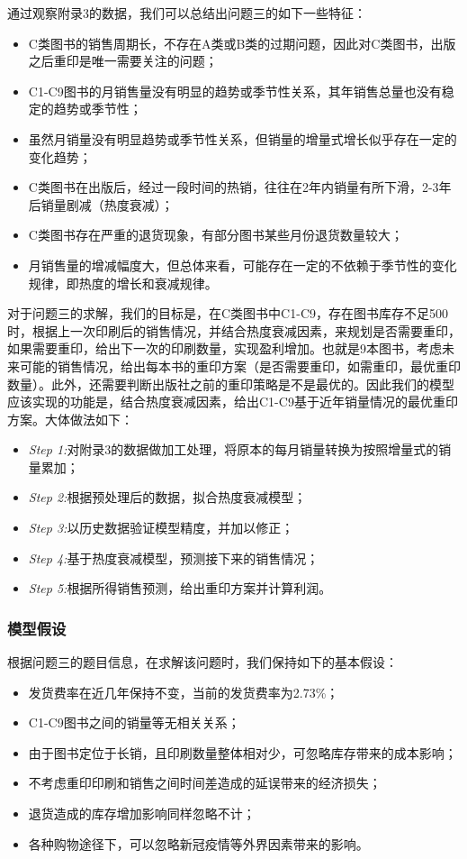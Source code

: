 \documentclass[bwprint]{gmcmthesis}
\begin{document}
通过观察附录3的数据，我们可以总结出问题三的如下一些特征：
\begin{itemize}
  \item C类图书的销售周期长，不存在A类或B类的过期问题，因此对C类图书，出版之后重印是唯一需要关注的问题；
  \item C1-C9图书的月销售量没有明显的趋势或季节性关系，其年销售总量也没有稳定的趋势或季节性；
  \item 虽然月销量没有明显趋势或季节性关系，但销量的增量式增长似乎存在一定的变化趋势；
  \item C类图书在出版后，经过一段时间的热销，往往在2年内销量有所下滑，2-3年后销量剧减（热度衰减）；
  \item C类图书存在严重的退货现象，有部分图书某些月份退货数量较大；
  \item 月销售量的增减幅度大，但总体来看，可能存在一定的不依赖于季节性的变化规律，即热度的增长和衰减规律。
\end{itemize}

对于问题三的求解，我们的目标是，在C类图书中C1-C9，存在图书库存不足500时，根据上一次印刷后的销售情况，并结合热度衰减因素，来规划是否需要重印，如果需要重印，给出下一次的印刷数量，实现盈利增加。也就是9本图书，考虑未来可能的销售情况，给出每本书的重印方案（是否需要重印，如需重印，最优重印数量）。此外，还需要判断出版社之前的重印策略是不是最优的。因此我们的模型应该实现的功能是，结合热度衰减因素，给出C1-C9基于近年销量情况的最优重印方案。大体做法如下：

\begin{itemize}
  \item \emph{Step 1:}对附录3的数据做加工处理，将原本的每月销量转换为按照增量式的销量累加；
  \item \emph{Step 2:}根据预处理后的数据，拟合热度衰减模型；
  \item \emph{Step 3:}以历史数据验证模型精度，并加以修正；
  \item \emph{Step 4:}基于热度衰减模型，预测接下来的销售情况；
  \item \emph{Step 5:}根据所得销售预测，给出重印方案并计算利润。
\end{itemize}

\subsubsection{模型假设}

根据问题三的题目信息，在求解该问题时，我们保持如下的基本假设：

\begin{itemize}
	\item 发货费率在近几年保持不变，当前的发货费率为2.73\%；
	\item C1-C9图书之间的销量等无相关关系；
	\item 由于图书定位于长销，且印刷数量整体相对少，可忽略库存带来的成本影响；
	\item 不考虑重印印刷和销售之间时间差造成的延误带来的经济损失；
	\item 退货造成的库存增加影响同样忽略不计；
	\item 各种购物途径下，可以忽略新冠疫情等外界因素带来的影响。
\end{itemize}
\end{document}
